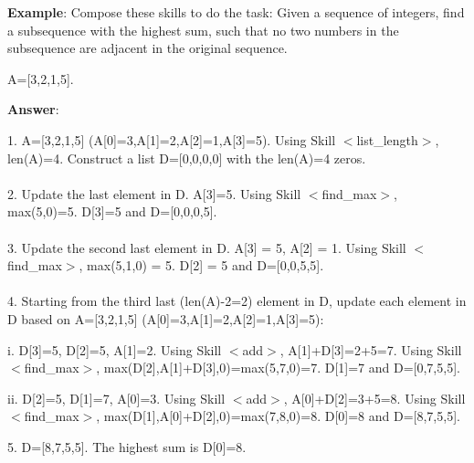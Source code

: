 \documentclass{article} %
\begin{document}
\begin{tcolorbox}[title = {An Example of Skill Composition for the Dynamic Programming Task}, colback = Apricot!25!white, colframe = BrickRed!75!black] 
\textbf{Example}: Compose these skills to do the task: Given a sequence of integers, find a subsequence with the highest sum, such that no two numbers in the subsequence are adjacent in the original sequence.  

A=[3,2,1,5].

 \quad

\textbf{Answer}:

1. A=[3,2,1,5] (A[0]=3,A[1]=2,A[2]=1,A[3]=5). Using Skill $<$list\_length$>$, len(A)=4. Construct a list D=[0,0,0,0] with the len(A)=4 zeros. \\ \\
2. Update the last element in D. A[3]=5. Using Skill $<$find\_max$>$, max(5,0)=5. D[3]=5 and D=[0,0,0,5]. \\ \\
3. Update the second last element in D. A[3] = 5, A[2] = 1. Using Skill $<$find\_max$>$, max(5,1,0) = 5. D[2] = 5 and D=[0,0,5,5]. \\ \\ 
4. Starting from the third last (len(A)-2=2) element in D, update each element in D based  on A=[3,2,1,5] (A[0]=3,A[1]=2,A[2]=1,A[3]=5): 

\quad

 \qquad   i. D[3]=5, D[2]=5, A[1]=2. Using Skill $<$add$>$, A[1]+D[3]=2+5=7.  Using Skill $<$find\_max$>$, max(D[2],A[1]+D[3],0)=max(5,7,0)=7.  D[1]=7 and D=[0,7,5,5]. 

 
  \qquad  ii. D[2]=5, D[1]=7, A[0]=3. Using Skill $<$add$>$, A[0]+D[2]=3+5=8. Using Skill $<$find\_max$>$, max(D[1],A[0]+D[2],0)=max(7,8,0)=8. D[0]=8 and D=[8,7,5,5]. 

\quad
  
5.  D=[8,7,5,5]. The highest sum is D[0]=8. 
\end{tcolorbox}
\noindent\begin{minipage}{\textwidth}    
 \label{Tab:compose_dp_skill}
\end{minipage}

\newpage
\end{document}
